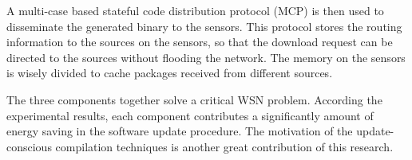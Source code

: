 A multi-case based stateful code distribution protocol (MCP) is then used to disseminate the generated binary to the sensors. This protocol stores the routing information to the sources on the sensors, so that the download request can be directed to the sources without flooding the network.
The memory on the sensors is wisely divided to cache packages received from different sources. 

The three components together solve a critical WSN problem. According the experimental results, each component contributes a significantly amount of energy saving in the software update procedure. The motivation of the update-conscious compilation techniques is another great contribution of this research.

